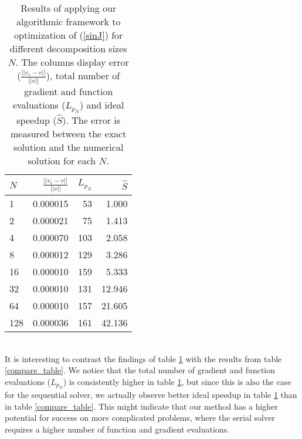 \begin{table}
\caption{Results of applying our algorithmic framework to optimization of (\ref{sinJ}) for different decomposition sizes $N$. The columns display error ($\frac{||v_e-v||}{||v||}$), total number of gradient and function evaluations ($L_{p_N}$) and ideal speedup ($\hat S$). The error is measured between the exact solution and the numerical solution for each $N$.}
\centering
\label{unsmoothTab}
\begin{tabular}{lrrr}
\toprule
{} $N$&   $\frac{||v_e-v||}{||v||}$ &  $L_{p_N}$ &     $\hat S$ \\
\midrule
1   &  0.000015 &   53 &   1.000 \\
2   &  0.000021 &   75 &   1.413 \\
4   &  0.000070 &  103 &   2.058 \\
8   &  0.000012 &  129 &   3.286 \\
16  &  0.000010 &  159 &   5.333 \\
32  &  0.000010 &  131 &  12.946 \\
64  &  0.000010 &  157 &  21.605 \\
128 &  0.000036 &  161 &  42.136 \\
\bottomrule
\end{tabular}
\end{table}
\\
It is interesting to contrast the findings of table \ref{unsmoothTab} with the results from table \ref{compare_table}. We notice that the total number of gradient and function evaluations ($L_{p_N}$) is consistently higher in table \ref{unsmoothTab}, but since this is also the case for the sequential solver, we actually observe better ideal speedup in table \ref{unsmoothTab} than in table \ref{compare_table}. This might indicate that our method has a higher potential for success on more complicated problems, where the serial solver requires a higher number of function and gradient evaluations.
